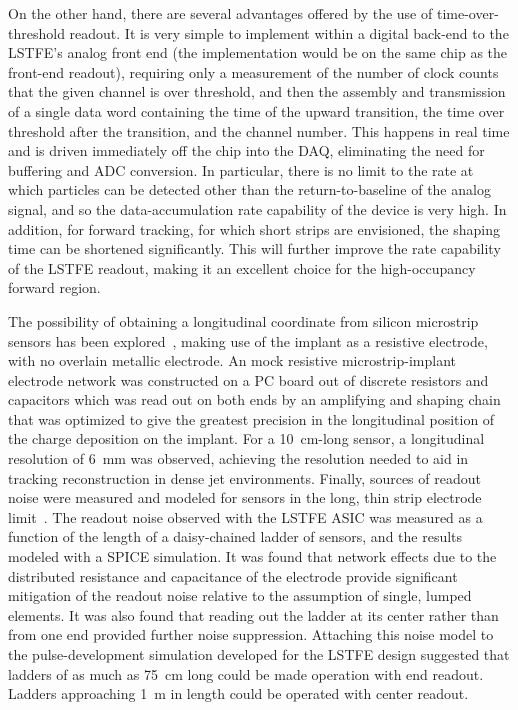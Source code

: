 On the other hand, there are several advantages offered by the use of time-over-threshold readout. It is very simple
to implement within a digital back-end to the LSTFE's analog front end (the implementation would be on the same chip
as the front-end readout), requiring only a measurement of the number of clock counts that the given channel is over
threshold, and then the assembly and transmission of a
single data word containing the time of the upward transition, the time over threshold after the transition, and the
channel number. This happens in real time and is driven immediately off the chip into the DAQ, eliminating the need
for buffering and ADC conversion. In particular, there is no limit to the rate at which particles can be detected
other than the return-to-baseline of the analog signal, and so the data-accumulation rate capability of the device
is very high. In addition, for forward tracking, for which short strips are envisioned, the shaping time can be
shortened significantly. This will further improve the rate capability of the LSTFE readout, making it an excellent
choice for the high-occupancy forward region.
%

The possibility of obtaining a longitudinal coordinate from silicon
microstrip sensors has been explored~\cite{Carman2011118}, making use of the
implant as a resistive electrode, with no overlain metallic electrode. An mock resistive
microstrip-implant electrode network was constructed on a PC board out of discrete resistors and capacitors
which was read out on both ends by an amplifying and shaping chain that was optimized to give the greatest
precision in the longitudinal position of the charge deposition on the implant. For a \SI{10}{cm}-long sensor,
a longitudinal resolution of \SI{6}{mm} was observed, achieving the resolution needed to aid in tracking
reconstruction in dense jet environments. Finally, sources of readout noise were measured and modeled
for sensors in the long, thin strip electrode limit~\cite{Collier2013127}. The readout noise observed
with the LSTFE ASIC was measured as a function of the length of a daisy-chained ladder of sensors,
and the results modeled with a SPICE simulation. It was found that network effects due to the
distributed resistance and capacitance of the electrode provide significant
mitigation of the readout noise relative to the assumption of single, lumped elements. It
was also found that reading out the ladder at its center rather than from one end provided
further noise suppression. Attaching this noise model to the pulse-development simulation
developed for the LSTFE design suggested that ladders of as much as \SI{75}{cm} long could be
made operation with end readout. Ladders approaching \SI{1}{m} in length could be operated with center readout.

